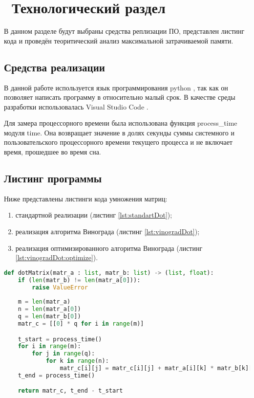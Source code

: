 \chapter{ Технологический раздел}
\label{cha:technological}

    В данном разделе будут выбраны средства реплизации ПО, представлен листинг кода
    и проведён теоритический анализ максимальной затрачиваемой памяти. 

    \section{Средства реализации}
        В данной работе используется язык программирования python \cite{python}, так как
        он позволяет написать программу в относительно малый срок.
        В качестве среды разработки использовалась Visual Studio Code \cite{visual-studio-code}.

        Для замера процессорного времени была использована функция process\_time \cite{process_time} модуля time.
        Она возвращает значение в долях секунды суммы системного и пользовательского процессорного времени текущего процесса и 
        не включает время, прошедшее во время сна.

    \section{Листинг программы}
        Ниже представлены листинги кода умножения матриц:
        \begin{enumerate}
            \item стандартной реализации (листинг \ref{lst:standartDot});
            \item реализация алгоритма Винограда (листинг \ref{lst:vinogradDot});
            \item реализация оптимизированного алгоритма Винограда (листинг \ref{lst:vinogradDot:optimize}).
        \end{enumerate}
        
        \begin{lstlisting}[language=python, label=lst:standartDot, caption=Реализация классического алгоритма умножения матриц]
def dotMatrix(matr_a : list, matr_b: list) -> (list, float):
    if (len(matr_b) != len(matr_a[0])):
        raise ValueError
    
    m = len(matr_a)
    n = len(matr_a[0])
    q = len(matr_b[0])
    matr_c = [[0] * q for i in range(m)]

    t_start = process_time()
    for i in range(m):
        for j in range(q):
            for k in range(n):
                matr_c[i][j] = matr_c[i][j] + matr_a[i][k] * matr_b[k][j]
    t_end = process_time()

    return matr_c, t_end - t_start
        \end{lstlisting}

